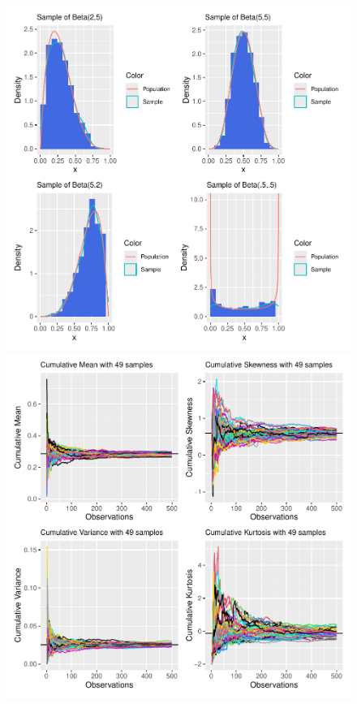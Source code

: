 \documentclass{article}\usepackage[]{graphicx}\usepackage[]{xcolor}
\begin{document}
\begin{figure}[H]
    \begin{center}
       \includegraphics[scale=0.5]{betaParam.pdf}
       \includegraphics[scale=0.5]{cumStats.pdf}
       \caption{}
     \label{cumStat}
     \end{center}
   \end{figure}
\end{document}
